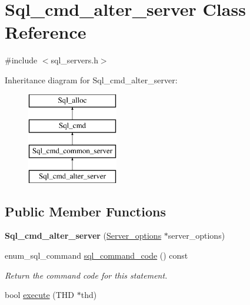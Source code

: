 \hypertarget{classSql__cmd__alter__server}{}\section{Sql\+\_\+cmd\+\_\+alter\+\_\+server Class Reference}
\label{classSql__cmd__alter__server}


{\ttfamily \#include $<$sql\+\_\+servers.\+h$>$}

Inheritance diagram for Sql\+\_\+cmd\+\_\+alter\+\_\+server\+:\begin{figure}[H]
\begin{center}
\leavevmode
\includegraphics[height=4.000000cm]{classSql__cmd__alter__server}
\end{center}
\end{figure}
\subsection*{Public Member Functions}
\begin{DoxyCompactItemize}
\item 
\mbox{\label{classSql__cmd__alter__server_a5cbaf31ef0e25f235f5c01baace42577}} 
{\bfseries Sql\+\_\+cmd\+\_\+alter\+\_\+server} (\mbox{\hyperlink{classServer__options}{Server\+\_\+options}} $\ast$server\+\_\+options)
\item 
\mbox{\label{classSql__cmd__alter__server_a8f4053c329131d853efb7a7b85ab044b}} 
enum\+\_\+sql\+\_\+command \mbox{\hyperlink{classSql__cmd__alter__server_a8f4053c329131d853efb7a7b85ab044b}{sql\+\_\+command\+\_\+code}} () const
\begin{DoxyCompactList}\small\item\em Return the command code for this statement. \end{DoxyCompactList}\item 
bool \mbox{\hyperlink{classSql__cmd__alter__server_a3f4f8ff26edf3f1780fc7ab7a98ccd2d}{execute}} (T\+HD $\ast$thd)
\end{DoxyCompactItemize}
